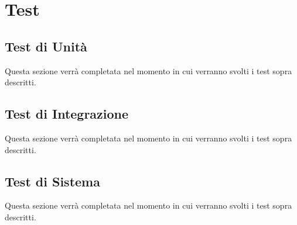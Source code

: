 \section{Test}
\label{test}


\subsection{Test di Unità}
Questa sezione verrà completata nel momento in cui verranno svolti i test sopra descritti.

\newpage
\subsection{Test di Integrazione}
Questa sezione verrà completata nel momento in cui verranno svolti i test sopra descritti.

\newpage
\subsection{Test di Sistema}
Questa sezione verrà completata nel momento in cui verranno svolti i test sopra descritti.
\newpage